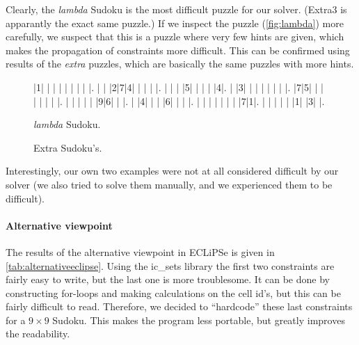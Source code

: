 Clearly, the \emph{lambda} Sudoku  is the most difficult puzzle for our solver. (Extra3 is apparantly the exact same puzzle.) If we inspect the puzzle (\autoref{fig:lambda}) more carefully, we suspect that this is a puzzle where very few hints are given, which makes the propagation of constraints more difficult. This can be confirmed using results of the \emph{extra} puzzles, which are basically the same puzzles with more hints.
\begin{figure}[hbpt]
\centering
\begin{sudoku}
|1| | | | | | | | |.
| | |2|7|4| | | | |.
| | | |5| | | | |4|.
| |3| | | | | | | |.
|7|5| | | | | | | |.
| | | | | |9|6| | |.
| |4| | | |6| | | |.
| | | | | | | |7|1|.
| | | | | |1| |3| |.
\end{sudoku}
\caption{\emph{lambda} Sudoku.}
\label{fig:lambda}
\end{figure}
\hfill
\begin{figure}[hbpt]
\centering %
\caption{Extra Sudoku's.}
\label{fig:extrasudoku}
\end{figure}

Interestingly, our own two examples were not at all considered difficult by our solver (we also tried to solve them manually, and we experienced them to be difficult).

\paragraph{Alternative viewpoint}
The results of the alternative viewpoint in ECLiPSe is given in \autoref{tab:alternativeeclipse}. Using the ic\_sets library the first two constraints are fairly easy to write, but the last one is more troublesome. It can be done by constructing for-loops and making calculations on the cell id's, but this can be fairly difficult to read. Therefore, we decided to ``hardcode'' these last constraints for a $9 \times 9$ Sudoku. This makes the program less portable, but greatly improves the readability.

